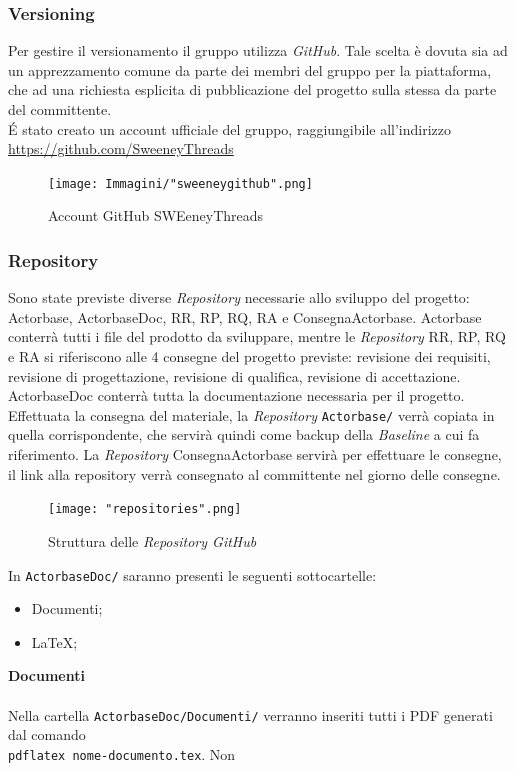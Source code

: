 \documentclass[a4paper]{article}
\begin{document}
	\subsubsection{Versioning}
	Per gestire il versionamento il gruppo utilizza \emph{GitHub}. Tale scelta è dovuta sia ad un apprezzamento
	comune da parte dei membri del gruppo per la piattaforma, che ad una richiesta esplicita di pubblicazione del
	progetto sulla stessa da parte del committente. \\
	\'E stato creato un account ufficiale del gruppo, raggiungibile all'indirizzo
	\url{https://github.com/SweeneyThreads}
	\begin{figure}[H]
		\centering
		\texttt{[image: Immagini/"sweeneygithub".png]}
		\caption{Account GitHub SWEeneyThreads}
	\end{figure}
		\subsubsection{Repository}
	Sono state previste diverse \emph{Repository} necessarie allo sviluppo del progetto: Actorbase, ActorbaseDoc, RR, RP, RQ, RA e ConsegnaActorbase. 	
    Actorbase conterrà tutti i file del prodotto da sviluppare, mentre le \emph{Repository} RR, RP, RQ e RA si riferiscono alle 4 consegne del 
    progetto previste: revisione dei requisiti, revisione di progettazione, revisione di qualifica, revisione di accettazione.
    ActorbaseDoc conterrà tutta la documentazione necessaria per il progetto.  
    Effettuata la consegna del materiale, la \emph{Repository} \verb|Actorbase/| verrà copiata in quella corrispondente, che servirà quindi come 
    backup della \emph{Baseline} a cui fa riferimento.
    La \emph{Repository} ConsegnaActorbase servirà per effettuare le consegne, il link alla repository verrà consegnato al committente nel giorno delle 
    consegne.
  	\begin{figure}[H]
		\centering
		\texttt{[image: "repositories".png]}
		\caption{Struttura delle \emph{Repository GitHub}}
	\end{figure}
	In \verb|ActorbaseDoc/| saranno presenti le seguenti sottocartelle:
	\begin{itemize}
		\item Documenti;
		\item LaTeX;
	\end{itemize}
	\textbf{Documenti} \\ \\
	Nella cartella \verb|ActorbaseDoc/Documenti/| verranno inseriti tutti i PDF generati dal comando \\ \verb|pdflatex nome-documento.tex|. Non
\end{document}
